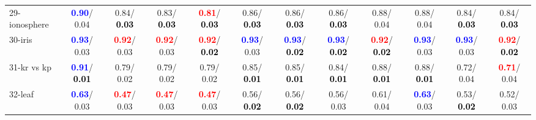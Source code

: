 \begin{table}[h]
\begin{center}
{\begin{tabular}{lc|c|c|c|c|c|c|c|c|c|c}
29-ionosphere & \textcolor{blue}{\textbf{  0.90}}/  0.04 &   0.84/\textcolor{black}{\textbf{  0.03}} &   0.83/\textcolor{black}{\textbf{  0.03}} & \textcolor{red}{\textbf{  0.81}}/\textcolor{black}{\textbf{  0.03}} &   0.86/\textcolor{black}{\textbf{  0.03}} &   0.86/\textcolor{black}{\textbf{  0.03}} &   0.86/\textcolor{black}{\textbf{  0.03}} &   0.88/  0.04 &   0.88/  0.04 &   0.84/\textcolor{black}{\textbf{  0.03}} &   0.84/\textcolor{black}{\textbf{  0.03}} \\
30-iris & \textcolor{blue}{\textbf{  0.93}}/  0.03 & \textcolor{red}{\textbf{  0.92}}/  0.03 & \textcolor{red}{\textbf{  0.92}}/  0.03 & \textcolor{red}{\textbf{  0.92}}/\textcolor{black}{\textbf{  0.02}} & \textcolor{blue}{\textbf{  0.93}}/  0.03 & \textcolor{blue}{\textbf{  0.93}}/\textcolor{black}{\textbf{  0.02}} & \textcolor{blue}{\textbf{  0.93}}/\textcolor{black}{\textbf{  0.02}} & \textcolor{red}{\textbf{  0.92}}/\textcolor{black}{\textbf{  0.02}} & \textcolor{blue}{\textbf{  0.93}}/  0.03 & \textcolor{blue}{\textbf{  0.93}}/  0.03 & \textcolor{red}{\textbf{  0.92}}/\textcolor{black}{\textbf{  0.02}} \\
31-kr vs kp & \textcolor{blue}{\textbf{  0.91}}/\textcolor{black}{\textbf{  0.01}} &   0.79/  0.02 &   0.79/  0.02 &   0.79/  0.02 &   0.85/\textcolor{black}{\textbf{  0.01}} &   0.85/\textcolor{black}{\textbf{  0.01}} &   0.84/\textcolor{black}{\textbf{  0.01}} &   0.88/\textcolor{black}{\textbf{  0.01}} &   0.88/\textcolor{black}{\textbf{  0.01}} &   0.72/  0.04 & \textcolor{red}{\textbf{  0.71}}/  0.04 \\
32-leaf & \textcolor{blue}{\textbf{  0.63}}/  0.03 & \textcolor{red}{\textbf{  0.47}}/  0.03 & \textcolor{red}{\textbf{  0.47}}/  0.03 & \textcolor{red}{\textbf{  0.47}}/  0.03 &   0.56/\textcolor{black}{\textbf{  0.02}} &   0.56/\textcolor{black}{\textbf{  0.02}} &   0.56/  0.03 &   0.61/  0.04 & \textcolor{blue}{\textbf{  0.63}}/  0.03 &   0.53/\textcolor{black}{\textbf{  0.02}} &   0.52/  0.03 \\\end{tabular}
}\label{strats0bRFw}
\end{center}
\end{table}
